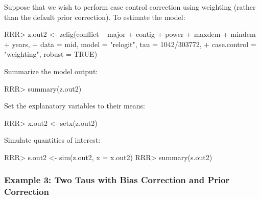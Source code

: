 Suppose that we wish to perform case control correction using
weighting (rather than the default prior correction).  To
estimate the model:  
\begin{Schunk}
\begin{Sinput}
RRR>  z.out2 <- zelig(conflict ~ major + contig + power + maxdem + mindem + years,
+                   data = mid, model = "relogit", tau = 1042/303772, 
+                   case.control = "weighting", robust = TRUE)
\end{Sinput}
\end{Schunk}
Summarize the model output:  
\begin{Schunk}
\begin{Sinput}
RRR>  summary(z.out2)
\end{Sinput}
\end{Schunk}
Set the explanatory variables to their means:  
\begin{Schunk}
\begin{Sinput}
RRR>  x.out2 <- setx(z.out2)
\end{Sinput}
\end{Schunk}
Simulate quantities of interest:
\begin{Schunk}
\begin{Sinput}
RRR>  s.out2 <- sim(z.out2, x = x.out2)
RRR>  summary(s.out2)
\end{Sinput}
\end{Schunk}

\subsubsection*{Example 3: Two Taus with Bias Correction and Prior Correction}


